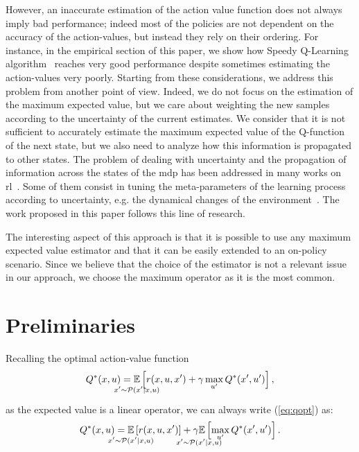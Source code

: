 However, an inaccurate estimation of the action value function does not always imply bad performance; indeed most of the policies are not dependent on the accuracy of the action-values, but instead they rely on their ordering. For instance, in the empirical section of this paper, we show how Speedy Q-Learning algorithm~\cite{NIPS2011_4251} reaches very good performance despite sometimes estimating the action-values very poorly. Starting from these considerations, we address this problem from another point of view. Indeed, we do not focus on the estimation of the maximum expected value, but we care about weighting the new samples according to the uncertainty of the current estimates. 
We consider that it is not sufficient to accurately estimate the maximum expected value of the Q-function of the next state, but we also need to analyze how this information is propagated to other states. The problem of dealing with uncertainty and the propagation of information across the states of the \gls{mdp} has been addressed in many works on \gls{rl}~\cite{mohagheghi2007proportional, Tewari2007}. Some of them consist in tuning the meta-parameters of the learning process according to uncertainty, e.g. the dynamical changes of the environment~\cite{schweighofer2003meta, Kobayashi2009, yoshida2013reinforcement}.
The work proposed in this paper follows this line of research.

The interesting aspect of this approach is that it is possible to use any maximum expected value estimator and that it can be easily extended to an on-policy scenario. Since we believe that the choice of the estimator is not a relevant issue in our approach, we choose the maximum operator as it is the most common.

\section{Preliminaries}
Recalling the optimal action-value function
\begin{align}
 Q^*(x,u)=\underset{\strut\mathclap{x'\sim \mathcal{P}(x'|x,u)}}{\mathbb{E}}\left[ r(x,u,x')+\gamma\max_{u'} Q^*(x',u')\right],
 \label{eq:qopt}
\end{align}
as the expected value is a linear operator, we can always write (\ref{eq:qopt}) as:
\begin{align}
 Q^*(x,u)=\underset{\strut\mathclap{x'\sim \mathcal{P}(x'|x,u)}}{\mathbb{E}}\left[ r(x,u,x')\right]+\underset{\strut\mathclap{x'\sim \mathcal{P}(x'|x,u)}}{\gamma\mathbb{E}}\left[ \max_{u'} Q^*(x',u')\right].
 \label{eq:qdec}
\end{align}

